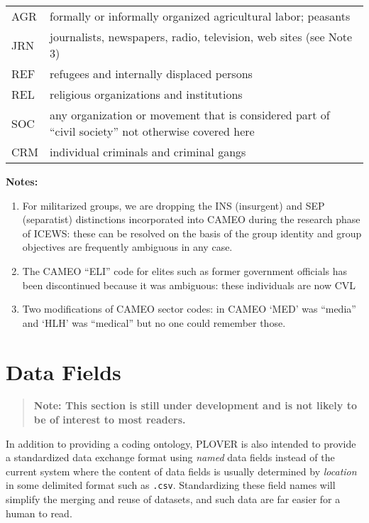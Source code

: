 \documentclass[11pt]{report}
\newcommand{\ti}[1]{\textit{#1}}
\newcommand{\txt}[1]{\texttt{#1}}
\begin{document}
\begin{center}
\begin{longtable}{|l|p{13cm}|}
	  AGR & formally or informally organized agricultural labor; peasants \\
	  JRN & journalists, newspapers, radio, television, web sites (see Note 3)  \\
	  REF & refugees and internally displaced persons \\
	  REL & religious organizations and institutions \\
	  SOC & any organization or movement that is considered part of ``civil society''  not otherwise covered here\\
	  CRM & individual criminals and criminal gangs \\
  \hline
\end{longtable}
\noindent \raggedright{\textbf{Notes:}}
\begin{enumerate}
\item For militarized groups, we are dropping the INS (insurgent) and SEP (separatist) distinctions incorporated into CAMEO during the research phase of ICEWS: these can be resolved on the basis of the group identity and group objectives are frequently ambiguous in any case.
\item The CAMEO ``ELI'' code for elites such as former government officials has been discontinued because it was ambiguous: these individuals are now CVL
\item Two modifications of CAMEO sector codes: in CAMEO `MED' was ``media'' and `HLH' was ``medical'' but no one could remember those.
\end{enumerate}
\end{center}


\chapter{Data Fields}

\begin{quote}
\textbf{Note: This section is still under development and is not likely to be of interest to most readers.}

\end{quote}
\bigskip

In addition to providing a coding ontology, PLOVER is also intended to provide a standardized data exchange format using \ti{named} data fields instead of the current system where the content of data fields is usually determined by \ti{location} in some delimited format such as \txt{.csv}. Standardizing these field names will simplify the merging and reuse of datasets, and such data are far easier for a human to read.
\end{document}
